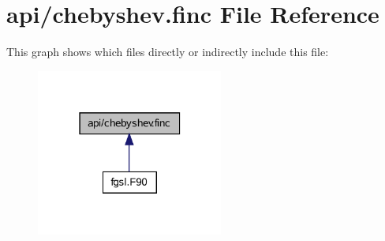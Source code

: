 \hypertarget{chebyshev_8finc}{}\section{api/chebyshev.finc File Reference}
\label{chebyshev_8finc}
This graph shows which files directly or indirectly include this file\+:\nopagebreak
\begin{figure}[H]
\begin{center}
\leavevmode
\includegraphics[width=174pt]{chebyshev_8finc__dep__incl}
\end{center}
\end{figure}

